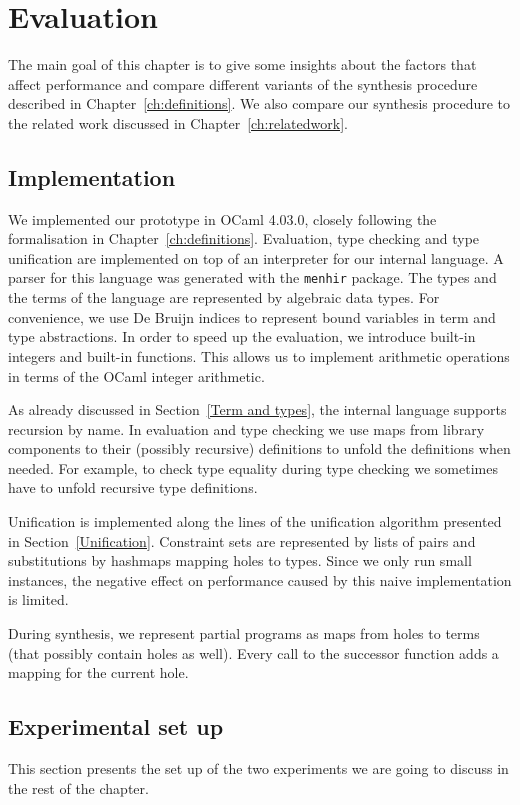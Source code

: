 \lstset{style=plain}

\chapter{Evaluation} \label{ch:evaluation}

The main goal of this chapter is to give some insights about the factors that affect performance and compare different variants of the synthesis procedure described in Chapter~\ref{ch:definitions}. We also compare our synthesis procedure to the related work discussed in Chapter~\ref{ch:relatedwork}.

\section{Implementation}
We implemented our prototype in OCaml 4.03.0, closely following the formalisation in Chapter~\ref{ch:definitions}.  Evaluation, type checking and type unification are implemented on top of an interpreter for our internal language.  A parser for this language was generated with the \lstinline!menhir! package.  The types and the terms of the language are represented by algebraic data types.  For convenience, we use De Bruijn indices \cite{DEBRUIJN1972381} to represent bound variables in term and type abstractions.  In order to speed up the evaluation, we introduce built-in integers and built-in functions.  This allows us to implement arithmetic operations in terms of the OCaml integer arithmetic.

As already discussed in Section~\ref{Term and types}, the internal language supports recursion by name.  In evaluation and type checking we use maps from library components to their (possibly recursive) definitions to unfold the definitions when needed.  For example, to check type equality during type checking we sometimes have to unfold recursive type definitions.

Unification is implemented along the lines of the unification algorithm presented in Section~\ref{Unification}. Constraint sets are represented by lists of pairs and substitutions by hashmaps mapping holes to types. Since we only run small instances, the negative effect on performance caused by this naive implementation is limited.

During synthesis, we represent partial programs as maps from holes to terms (that possibly contain holes as well). Every call to the successor function adds a mapping for the current hole.


\section{Experimental set up}
This section presents the set up of the two experiments we are going to discuss in the rest of the chapter.

